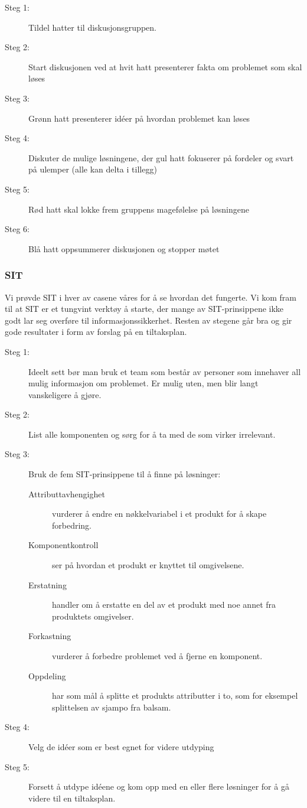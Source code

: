 \begin{description}
    \item[Steg 1:] Tildel hatter til diskusjonsgruppen. 
    \item[Steg 2:] Start diskusjonen ved at hvit hatt presenterer fakta om problemet som skal løses
    \item[Steg 3:] Grønn hatt presenterer idéer på hvordan problemet kan løses
    \item[Steg 4:] Diskuter de mulige løsningene, der gul hatt fokuserer på fordeler og svart på ulemper (alle kan delta i tillegg)
    \item[Steg 5:] Rød hatt skal lokke frem gruppens magefølelse på løsningene
    \item[Steg 6:] Blå hatt oppsummerer diskusjonen og stopper møtet
\end{description}
    
\subsubsection{SIT} 
Vi prøvde SIT i hver av casene våres for å se hvordan det fungerte. Vi kom fram til at SIT er et tungvint verktøy å starte, der mange av SIT-prinsippene ikke godt lar seg overføre til informasjonssikkerhet. Resten av stegene går bra og gir gode resultater i form av forslag på en tiltaksplan.  
    \begin{description}
        \item[Steg 1:] Ideelt sett bør man bruk et team som består av personer som innehaver all mulig informasjon om problemet. Er mulig uten, men blir langt vanskeligere å gjøre.
        \item[Steg 2:] List alle komponenten og sørg for å ta med de som virker irrelevant. 
        \item[Steg 3:] Bruk de fem SIT-prinsippene til å finne på løsninger:
                \begin{description}
                    \item[Attributtavhengighet] vurderer å endre en nøkkelvariabel i et produkt for å skape forbedring.
                    \item[Komponentkontroll] ser på hvordan et produkt er knyttet til omgivelsene.
                    \item[Erstatning] handler om å erstatte en del av et produkt med noe annet fra produktets omgivelser.
                    \item[Forkastning] vurderer å forbedre problemet ved å fjerne en komponent. 
                    \item[Oppdeling] har som mål å splitte et produkts attributter i to, som for eksempel splittelsen av sjampo fra balsam.
                \end{description}
        \item[Steg 4:] Velg de idéer som er best egnet for videre utdyping
        \item[Steg 5:] Forsett å utdype idéene og kom opp med en eller flere løsninger for å gå videre til en tiltaksplan.
    \end{description}

